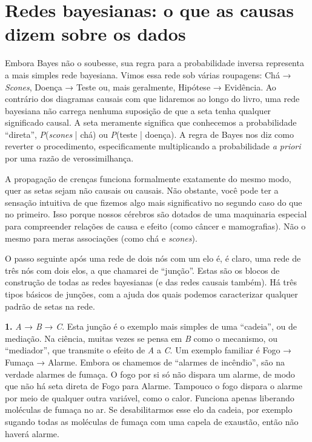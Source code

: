 \documentclass[11pt,a5paper,twoside]{book}
\begin{document}
\section{Redes bayesianas: o que as causas dizem sobre os dados}
Embora Bayes não o soubesse, sua regra para a probabilidade inversa representa a mais simples rede bayesiana. Vimos essa rede sob várias roupagens: Chá → \textit{Scones}, Doença → Teste ou, mais geralmente, Hipótese → Evidência. Ao contrário dos diagramas causais com que lidaremos ao longo do livro, uma rede bayesiana não carrega nenhuma suposição de que a seta tenha qualquer significado causal. A seta meramente significa que conhecemos a probabilidade “direta”, \textit{P}(\textit{scones} | chá) ou \textit{P}(teste | doença). A regra de Bayes nos diz como reverter o procedimento, especificamente multiplicando a probabilidade \textit{a priori} por uma razão de verossimilhança.

A propagação de crenças funciona formalmente exatamente do mesmo modo, quer as setas sejam não causais ou causais. Não obstante, você pode ter a sensação intuitiva de que fizemos algo mais significativo no segundo caso do que no primeiro. Isso porque nossos cérebros são dotados de uma maquinaria especial para compreender relações de causa e efeito (como câncer e mamografias). Não o mesmo para meras associações (como chá e \textit{scones}).

O passo seguinte após uma rede de dois nós com um elo é, é claro, uma rede de três nós com dois elos, a que chamarei de “junção”. Estas são os blocos de construção de todas as redes bayesianas (e das redes causais também). Há três tipos básicos de junções, com a ajuda dos quais podemos caracterizar qualquer padrão de setas na rede.

\textbf{1.} \textit{A} → \textit{B} → \textit{C}. Esta junção é o exemplo mais simples de uma “cadeia”, ou de mediação. Na ciência, muitas vezes se pensa em \textit{B} como o mecanismo, ou “mediador”, que transmite o efeito de \textit{A} a \textit{C}. Um exemplo familiar é Fogo → Fumaça → Alarme. Embora os chamemos de “alarmes de incêndio”, são na verdade alarmes de fumaça. O fogo por si só não dispara um alarme, de modo que não há seta direta de Fogo para Alarme. Tampouco o fogo dispara o alarme por meio de qualquer outra variável, como o calor. Funciona apenas liberando moléculas de fumaça no ar. Se desabilitarmos esse elo da cadeia, por exemplo sugando todas as moléculas de fumaça com uma capela de exaustão, então não haverá alarme.
\end{document}

